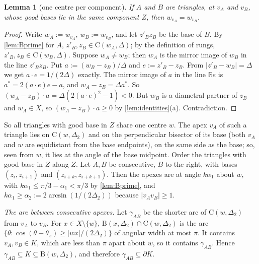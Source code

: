 \documentclass[11pt]{amsart}
\newtheorem{lemma}[theorem]{Lemma}
\theoremstyle{definition}
\theoremstyle{remark}
\newcommand{\R}{\mathbb{R}}
\newcommand{\Dt}{\Delta_2}
\newcommand{\Cc}{\mathrm{C}}      %
\newcommand{\Dd}{\mathrm{B}}      %
\begin{document}
\begin{lemma}[one centre per component]\label{lem:W}
If $A$ and $B$ are triangles, at $v_A$ and $v_B$, whose good bases lie in the same component $Z$, then $w_{v_A}=w_{v_B}$.
\end{lemma}
\begin{proof}
Write $w_A:=w_{v_A}$, $w_B:=w_{v_B}$, and let $z'_Bz_B$ be the base of $B$. By \cref{lem:Bprime} for $A$, $z'_B,z_B\in\Cc(w_A,\Delta)$; by the definition of rungs, $z'_B,z_B\in\Cc(w_B,\Delta)$. Suppose $w_A\neq w_B$; then $w_A$ is the mirror image of $w_B$ in the line $z'_Bz_B$. Put $a:=(w_B-z_B)/\Delta$ and $e:=z'_B-z_B$. From $|z'_B-w_B|=\Delta$ we get $a\cdot e=1/(2\Delta)$ exactly. The mirror image of $a$ in the line $\R e$ is $a^*=2(a\cdot e)e-a$, and $w_A-z_B=\Delta a^*$. So $(w_A-z_B)\cdot a=\Delta(2(a\cdot e)^2-1)<0$. But $w_B$ is a diametral partner of $z_B$ and $w_A\in X$, so $(w_A-z_B)\cdot a\ge0$ by \cref{lem:identities}(a). Contradiction.
\end{proof}

So all triangles with good base in $Z$ share one centre $w$. The apex $v_A$ of such a triangle lies on $\Cc(w,\Dt)$ and on the perpendicular bisector of its base (both $v_A$ and $w$ are equidistant from the base endpoints), on the same side as the base; so, seen from $w$, it lies at the angle of the base midpoint. Order the triangles with good base in $Z$ along $Z$. Let $A,B$ be consecutive, $B$ to the right, with bases $(z_i,z_{i+1})$ and $(z_{i+k},z_{i+k+1})$. Then the apexes are at angle $k\alpha_1$ about $w$, with $k\alpha_1\le\pi/3-\alpha_1<\pi/3$ by \cref{lem:Bprime}, and $k\alpha_1\ge\alpha_2:=2\arcsin(1/(2\Dt))$ because $|v_Av_B|\ge1$.

\emph{The arc between consecutive apexes.} Let $\gamma_{AB}$ be the shorter arc of $\Cc(w,\Dt)$ from $v_A$ to $v_B$. For $x\in X\setminus\{w\}$, $\Dd(x,\Dt)\cap\Cc(w,\Dt)$ is the arc $\{\theta:\cos(\theta-\theta_x)\ge|wx|/(2\Dt)\}$ of angular width at most $\pi$. It contains $v_A,v_B\in K$, which are less than $\pi$ apart about $w$, so it contains $\gamma_{AB}$. Hence $\gamma_{AB}\subseteq K\subseteq\Dd(w,\Dt)$, and therefore $\gamma_{AB}\subseteq\partial K$.
\end{document}
